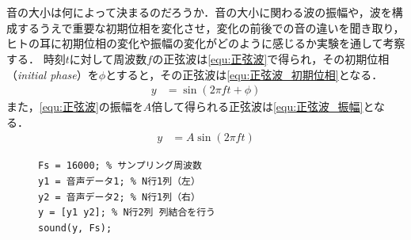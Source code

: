 \section{\kadaiab}\label{sec:\kadaiab}
\purpose
音の大小は何によって決まるのだろうか．音の大小に関わる波の振幅や，波を構成するうえで重要な初期位相を変化させ，変化の前後での音の違いを聞き取り，ヒトの耳に初期位相の変化や振幅の変化がどのように感じるか実験を通して考察する．
\method
時刻\(t\)に対して周波数\(f\)の正弦波は\eqref{equ:正弦波}で得られ，その初期位相（\textit{initial phase}）を\(\phi\)とすると，その正弦波は\eqref{equ:正弦波_初期位相}となる．
\begin{align}
    y & =\sin(2\pi ft+\phi)\label{equ:正弦波_初期位相}
\end{align}また，\eqref{equ:正弦波}の振幅を\(A\)倍して得られる正弦波は\eqref{equ:正弦波_振幅}となる．
\begin{align}
    y & =A\sin(2\pi ft)\label{equ:正弦波_振幅}
\end{align}
\begin{figure}
    \begin{lstlisting}[caption={左右から別の音を出力},label={src:左右から別の音を出力},numbers={none}]
Fs = 16000; % サンプリング周波数
y1 = 音声データ1; % N行1列（左）
y2 = 音声データ2; % N行1列（右）
y = [y1 y2]; % N行2列 列結合を行う
sound(y, Fs); 
    \end{lstlisting}
    \vspace{-1cm}
\end{figure}
